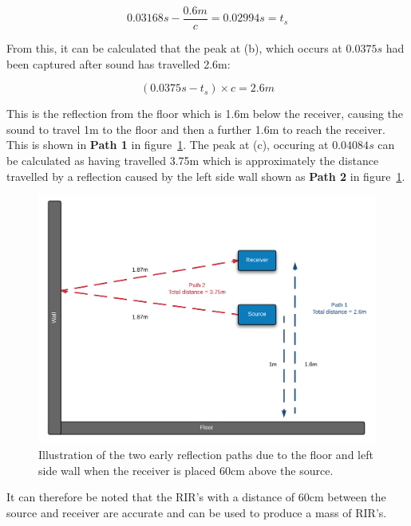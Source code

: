 \documentclass[../../main.tex]{subfiles}
\begin{document}
			\begin{equation}
			0.03168s - \frac{0.6m}{c} = 0.02994s = t_s
			\end{equation}

			From this, it can be calculated that the peak at (b), which occurs at $0.0375s$ had been captured after sound has travelled 2.6m:

			\begin{equation}
			(0.0375s - t_s)\times{c} = 2.6m
			\end{equation}

			This is the reflection from the floor which is 1.6m below the receiver, causing the sound to travel 1m to the floor and then a further 1.6m to reach the receiver. This is shown in \textbf{Path 1} in figure~\ref{reflectionPaths}. The peak at (c), occuring at $0.04084s$ can be calculated as having travelled 3.75m which is approximately the distance travelled by a reflection caused by the left side wall shown as \textbf{Path 2} in figure~\ref{reflectionPaths}.

			\begin{figure}[H]
			\centerline{\includegraphics[scale = 0.25]{Sections/Implementation/Odeon/images/incorrectRIR/reflectionPaths_colourV1.png}}
				\caption{Illustration of the two early reflection paths due to the floor and left side wall when the receiver is placed 60cm above the source.}
				\label{reflectionPaths}
			\end{figure}

			It can therefore be noted that the \ac{RIR}'s with a distance of 60cm between the source and receiver are accurate and can be used to produce a mass of \ac{RIR}'s.
\end{document}
